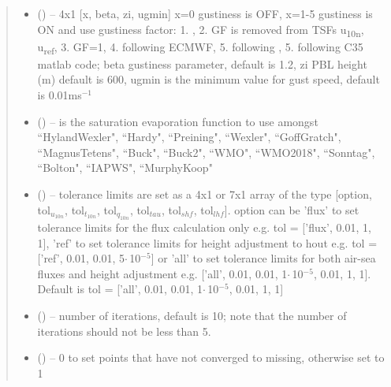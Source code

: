 \documentclass[letterpaper,10pt,english]{sphinxmanual}
\begin{document}
\begin{fulllineitems}
\begin{quote}
\begin{description}
\begin{itemize}
\item {} 
 (\href{https://docs.python.org/3/library/functions.html\#int}{}) -- 4x1 [x, beta, zi, ugmin] x=0 gustiness is OFF, x=1-5 gustiness is ON
            and use gustiness factor: 1. \cite{Fairall_etal_2003}, 2. GF is removed from TSFs u\textsubscript{10n}, u\textsubscript{ref}, 3. GF=1, 4. following ECMWF, 5. following \cite{Zeng_etal_1998},
            5. following C35 matlab code; beta gustiness parameter, default is 1.2, zi PBL height (m) default is 600, ugmin is the minimum value for gust speed, default is 0.01ms$^{-1}$

\item {} 
 (\href{https://docs.python.org/3/library/stdtypes.html\#str}{}) -- is the saturation evaporation function to use amongst ``HylandWexler", ``Hardy", ``Preining", ``Wexler", ``GoffGratch", ``MagnusTetens", ``Buck", ``Buck2", ``WMO", ``WMO2018", ``Sonntag", ``Bolton", ``IAPWS", ``MurphyKoop"

\item {} 
 (\href{https://docs.python.org/3/library/functions.html\#float}{}) -- tolerance limits are set as a 4x1 or 7x1 array of the type [option, tol$_{u_{10n}}$, tol$_{t_{10n}}$, tol$_{q_{10n}}$, tol$_{tau}$, tol$_{shf}$, tol$_{lhf}$]. option can be 'flux' to set tolerance limits for the flux calculation only e.g. tol = ['flux', 0.01, 1, 1], 'ref' to set tolerance limits  for height adjustment to hout e.g. tol = ['ref', 0.01, 0.01, 5$\cdot$\,10$^{-5}$] or 'all' to set tolerance limits for both air-sea fluxes and height adjustment e.g. ['all', 0.01, 0.01, 1$\cdot$\,10$^{-5}$, 0.01, 1, 1]. Default is tol =  ['all', 0.01, 0.01, 1$\cdot$\,10$^{-5}$, 0.01, 1, 1]

\item {} 
 (\href{https://docs.python.org/3/library/functions.html\#int}{}) -- number of iterations, default is 10; note that the number of iterations should not be less than 5.

\item {} 
 (\href{https://docs.python.org/3/library/functions.html\#int}{}) -- 0 to set points that have not converged to missing, otherwise set to 1 


\end{itemize}
\end{description}
\end{quote}
\end{fulllineitems}
\end{document}
